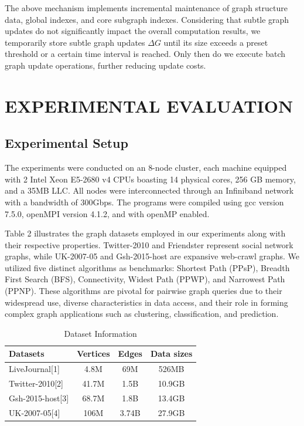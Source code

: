 \documentclass[lettersize,journal]{IEEEtran} %
\begin{document}
The above mechanism implements incremental maintenance of graph structure data, global indexes, and core subgraph indexes. Considering that subtle graph updates do not significantly impact the overall computation results, we temporarily store subtle graph updates $\Delta G$ until its size exceeds a preset threshold or a certain time interval is reached. Only then do we execute batch graph update operations, further reducing update costs.

\section{EXPERIMENTAL EVALUATION}
\subsection{Experimental Setup}
The experiments were conducted on an 8-node cluster, each machine equipped with 2 Intel Xeon E5-2680 v4 CPUs boasting 14 physical cores, 256 GB memory, and a 35MB LLC. All nodes were interconnected through an Infiniband network with a bandwidth of 300Gbps. The programs were compiled using gcc version 7.5.0, openMPI version 4.1.2, and with openMP enabled.
    
Table 2 illustrates the graph datasets employed in our experiments along with their respective properties. Twitter-2010 and Friendster represent social network graphs, while UK-2007-05 and Gsh-2015-host are expansive web-crawl graphs. We utilized five distinct algorithms as benchmarks: Shortest Path (PPsP), Breadth First Search (BFS), Connectivity, Widest Path (PPWP), and Narrowest Path (PPNP). These algorithms are pivotal for pairwise graph queries due to their widespread use, diverse characteristics in data access, and their role in forming complex graph applications such as clustering, classification, and prediction.
\begin{table}[h]
    \centering
    \begin{tabular}{lccc}
    \hline
    Datasets          & Vertices & Edges  & Data sizes \\
    \hline
    LiveJournal[1]    & 4.8M     & 69M    & 526MB      \\
    Twitter-2010[2]   & 41.7M    & 1.5B   & 10.9GB     \\
    Gsh-2015-host[3]  & 68.7M    & 1.8B   & 13.4GB     \\
    UK-2007-05[4]     & 106M     & 3.74B  & 27.9GB     \\
    \hline
    \end{tabular}
    \caption{Dataset Information}
    \end{table}
\end{document}
